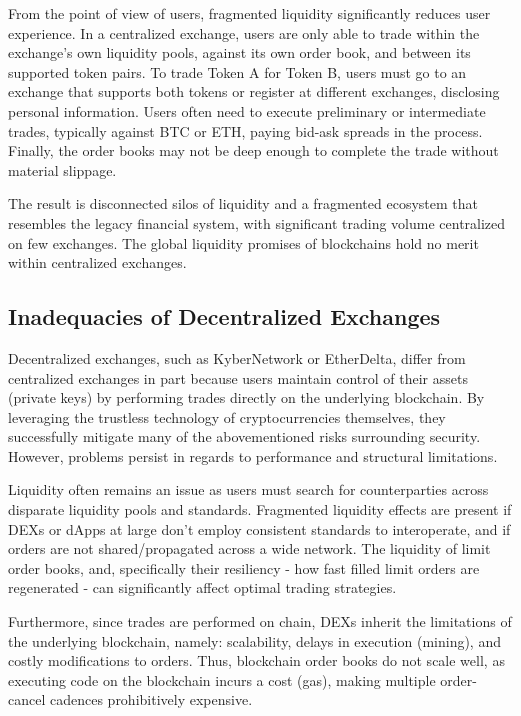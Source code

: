\documentclass[UTF8,nofonts]{article}
\begin{document}
\begin{multicols}{2}
From the point of view of users, fragmented liquidity significantly reduces user experience. In a centralized exchange, users are only able to trade within the exchange's own liquidity pools, against its own order book, and between its supported token pairs. To trade Token A for Token B, users must go to an exchange that supports both tokens or register at different exchanges, disclosing personal information. Users often need to execute preliminary or intermediate trades, typically against BTC or ETH, paying bid-ask spreads in the process. Finally, the order books may not be deep enough to complete the trade without material slippage.

The result is disconnected silos of liquidity and a fragmented ecosystem that resembles the legacy financial system, with significant trading volume centralized on few exchanges. The global liquidity promises of blockchains hold no merit within centralized exchanges.

\subsection{Inadequacies of Decentralized Exchanges}
Decentralized exchanges, such as KyberNetwork or EtherDelta, differ from centralized exchanges in part because users maintain control of their assets (private keys) by performing trades directly on the underlying blockchain. By leveraging the trustless technology of cryptocurrencies themselves, they successfully mitigate many of the abovementioned risks surrounding security. However, problems persist in regards to performance and structural limitations. 

Liquidity often remains an issue as users must search for counterparties across disparate liquidity pools and standards. Fragmented liquidity effects are present if DEXs or dApps at large don't employ consistent standards to interoperate, and if orders are not shared/propagated across a wide network. The liquidity of limit order books, and, specifically their resiliency - how fast filled limit orders are regenerated - can significantly affect optimal trading strategies\cite{limitorderliquidity}.

Furthermore, since trades are performed on chain, DEXs inherit the limitations of the underlying blockchain, namely: scalability, delays in execution (mining), and costly modifications to orders. Thus, blockchain order books do not scale well, as executing code on the blockchain incurs a cost (gas), making multiple order-cancel cadences prohibitively expensive. 


\end{multicols}
\end{document}
